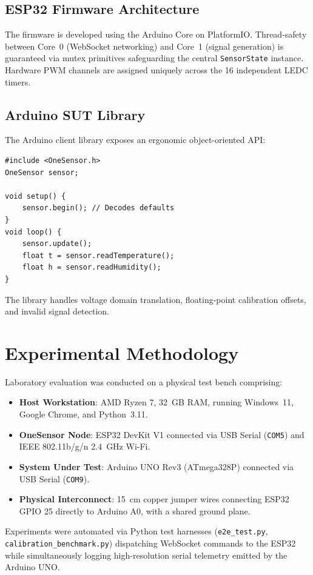 \documentclass[conference]{IEEEtran}
\begin{document}
\subsection{ESP32 Firmware Architecture}
The firmware is developed using the Arduino Core on PlatformIO. Thread-safety between Core~0 (WebSocket networking) and Core~1 (signal generation) is guaranteed via mutex primitives safeguarding the central \texttt{SensorState} instance. Hardware PWM channels are assigned uniquely across the 16 independent LEDC timers.

\subsection{Arduino SUT Library}
The Arduino client library exposes an ergonomic object-oriented API:
\begin{verbatim}
#include <OneSensor.h>
OneSensor sensor;

void setup() {
    sensor.begin(); // Decodes defaults
}
void loop() {
    sensor.update();
    float t = sensor.readTemperature();
    float h = sensor.readHumidity();
}
\end{verbatim}
The library handles voltage domain translation, floating-point calibration offsets, and invalid signal detection.

\section{Experimental Methodology}
Laboratory evaluation was conducted on a physical test bench comprising:
\begin{itemize}
    \item \textbf{Host Workstation}: AMD Ryzen 7, 32~GB RAM, running Windows~11, Google Chrome, and Python~3.11.
    \item \textbf{OneSensor Node}: ESP32 DevKit V1 connected via USB Serial (\texttt{COM5}) and IEEE 802.11b/g/n 2.4~GHz Wi-Fi.
    \item \textbf{System Under Test}: Arduino UNO Rev3 (ATmega328P) connected via USB Serial (\texttt{COM9}).
    \item \textbf{Physical Interconnect}: 15~cm copper jumper wires connecting ESP32 GPIO 25 directly to Arduino A0, with a shared ground plane.
\end{itemize}

Experiments were automated via Python test harnesses (\texttt{e2e\_test.py}, \texttt{calibration\_benchmark.py}) dispatching WebSocket commands to the ESP32 while simultaneously logging high-resolution serial telemetry emitted by the Arduino UNO.
\end{document}
